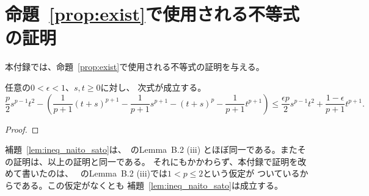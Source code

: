 
\section{命題~\ref{prop:exist}で使用される不等式の証明}

本付録では、命題~\ref{prop:exist}で使用される不等式の証明を与える。

\begin{lem} \label{lem:ineq_naito_sato}
 任意の$0 < \epsilon < 1$、$s, t \geq 0$に対し、
 次式が成立する。
 \begin{equation}
  \frac{p}{2}s^{p-1}t^2 - 
   \left( \frac{1}{p+1}(t+s)^{p+1} -
    \frac{1}{p+1}s^{p+1} - (t + s)^p - \frac{1}{p+1}t^{p+1}
   \right) \leq \frac{\epsilon p}{2} s^{p-1}
   t^2 + \frac{1-\epsilon}{p+1} t^{p+1}.
 \end{equation}
\end{lem}
 
\begin{proof}
 
\end{proof}

補題~\ref{lem:ineq_naito_sato}は、\cite{MR2886160}~のLemma~B.2 (iii)
とほぼ同一である。またその証明は、以上の証明と同一である。
それにもかかわらず、本付録で証明を改めて書いたのは、
\cite{MR2886160}~のLemma~B.2 (iii)では$1 < p \leq 2$という仮定が
ついているからである。この仮定がなくとも
補題~\ref{lem:ineq_naito_sato}は成立する。


